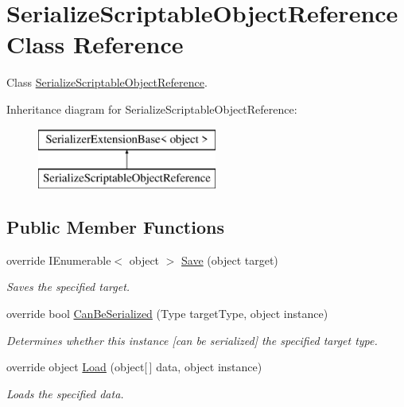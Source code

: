 \hypertarget{class_serialize_scriptable_object_reference}{}\section{Serialize\+Scriptable\+Object\+Reference Class Reference}
\label{class_serialize_scriptable_object_reference}


Class \hyperlink{class_serialize_scriptable_object_reference}{Serialize\+Scriptable\+Object\+Reference}.  


Inheritance diagram for Serialize\+Scriptable\+Object\+Reference\+:\begin{figure}[H]
\begin{center}
\leavevmode
\includegraphics[height=2.000000cm]{class_serialize_scriptable_object_reference}
\end{center}
\end{figure}
\subsection*{Public Member Functions}
\begin{DoxyCompactItemize}
\item 
override I\+Enumerable$<$ object $>$ \hyperlink{class_serialize_scriptable_object_reference_a5356a3b70d63530dfa62962144c23ff5}{Save} (object target)
\begin{DoxyCompactList}\small\item\em Saves the specified target. \end{DoxyCompactList}\item 
override bool \hyperlink{class_serialize_scriptable_object_reference_a830bb74938329482397d7975b8853eaf}{Can\+Be\+Serialized} (Type target\+Type, object instance)
\begin{DoxyCompactList}\small\item\em Determines whether this instance \mbox{[}can be serialized\mbox{]} the specified target type. \end{DoxyCompactList}\item 
override object \hyperlink{class_serialize_scriptable_object_reference_a83057b58f36e559106c518db722a8b81}{Load} (object\mbox{[}$\,$\mbox{]} data, object instance)
\begin{DoxyCompactList}\small\item\em Loads the specified data. \end{DoxyCompactList}\end{DoxyCompactItemize}


